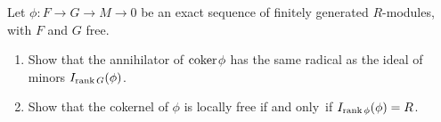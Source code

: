 \begin{exercise}
\label{Fitt}
Let $\phi: F\to G \to M\to 0$ be an exact sequence of finitely generated
$R$-modules,
with $F$ and $G$ free.

\begin{enumerate}
\item Show that the annihilator of  ${\rm{coker}\kern1pt} \phi$ has the
same radical as the ideal 
of minors
$I_{\operatorname{rank} G}(\phi)$.
\item 
Show that the cokernel of $\phi$
is locally free if and only~if $I_{\operatorname{rank} \phi}(\phi)= R$.
\end{enumerate}
\end{exercise}


